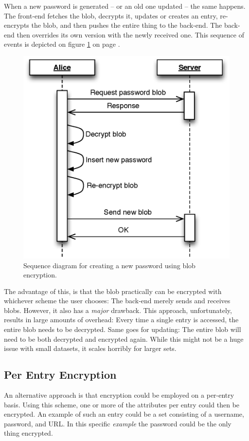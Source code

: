 			When a new password is generated -- or an old one updated -- the same happens. The front-end fetches the blob, decrypts it, updates or creates an entry, re-encrypts the blob, and then pushes the entire thing to the back-end. The back-end then overrides its own version with the newly received one. This sequence of events is depicted on figure \ref{fig:seq_blob} on page \pageref{fig:seq_blob}.

			\begin{figure}[h!]
				\centering
				\includegraphics[width=\textwidth]{figures/design/uml/sequence/blob.eps}
				\caption{Sequence diagram for creating a new password using blob encryption.}
				\label{fig:seq_blob}
			\end{figure}

			The advantage of this, is that the blob practically can be encrypted with whichever scheme the user chooses: The back-end merely sends and receives blobs. However, it also has a \emph{major} drawback. This approach, unfortunately, results in large amounts of overhead: Every time a single entry is accessed, the entire blob needs to be decrypted. Same goes for updating: The entire blob will need to be both decrypted and encrypted again. While this might not be a huge issue with small datasets, it scales horribly for larger sets.

		\subsection{Per Entry Encryption}
			An alternative approach is that encryption could be employed on a per-entry basis. Using this scheme, one or more of the attributes per entry could then be encrypted. An example of such an entry could be a set consisting of a username, password, and URL. In this specific \emph{example} the password could be the only thing encrypted. 

